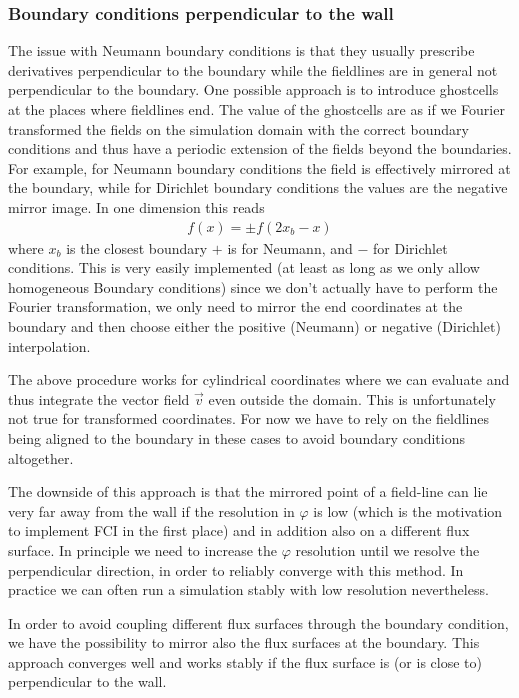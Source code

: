 \subsubsection{ Boundary conditions perpendicular to the wall}
The issue with Neumann boundary conditions is that they usually prescribe
derivatives perpendicular to the boundary
while the fieldlines are in general not perpendicular to the boundary.
One possible approach is to introduce ghostcells at the
places where fieldlines end. The value of the ghostcells are
as if we Fourier transformed the fields on the simulation domain
with the correct boundary conditions and thus have a periodic
extension of the fields beyond the boundaries.
For example, for Neumann boundary
conditions the field is effectively mirrored at the boundary, while for
Dirichlet boundary conditions the values are the negative mirror image. In one
dimension this reads
\begin{align}
f(x) = \pm f(2x_b-x)
\end{align}
where $x_b$ is the closest boundary $+$ is for Neumann, and $-$ for Dirichlet conditions.
This is very easily implemented (at least as long as we only allow
homogeneous Boundary conditions) since we don't actually have to
perform the Fourier transformation, we only need to mirror the end
coordinates at the boundary and then choose either the positive (Neumann) or
negative (Dirichlet) interpolation.

The above procedure works for cylindrical coordinates where we can
evaluate and thus integrate the vector field $\vec v$ even outside the domain.
This is unfortunately not true for transformed coordinates.
For now we have to rely on the fieldlines being aligned to the
boundary in these cases to avoid boundary conditions altogether.

The downside of this approach is that the mirrored point of a field-line
can lie very far away from the wall if the resolution in $\varphi$ is low (which
is the motivation to implement FCI in the first place) and
in addition also on a different flux surface.
In principle we need to increase the $\varphi$ resolution until we resolve
the perpendicular direction, in order to reliably converge with this method.
In practice we can often run a simulation stably with low resolution nevertheless.

In order to avoid coupling different flux surfaces through the boundary condition, we have the possibility to
mirror also the flux surfaces at the boundary.
This approach converges well and works stably if the flux surface is (or is close to) perpendicular to the wall.

